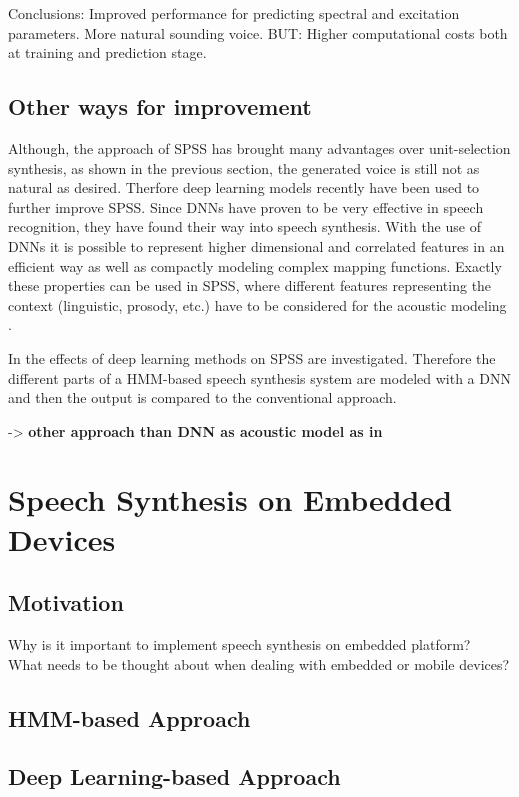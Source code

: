 Conclusions: Improved performance for predicting spectral and excitation parameters. More natural sounding voice. BUT: Higher computational costs both at training and prediction stage.

\newpage

\subsection{Other ways for improvement}
\label{subsec:deepeffect}

Although, the approach of \ac{SPSS} has brought many advantages over unit-selection synthesis, as shown in the previous section, the generated voice is still not as natural as desired. Therfore deep learning models recently have been used to further improve \ac{SPSS}. Since \acp{DNN} have proven to be very effective in speech recognition, they have found their way into speech synthesis. With the use of \acp{DNN} it is possible to represent higher dimensional and correlated features in an efficient way as well as compactly modeling complex mapping functions. Exactly these properties can be used in \ac{SPSS}, where different features representing the context (linguistic, prosody, etc.) have to be considered for the acoustic modeling \cite{hashimoto:effect}.

In \cite{hashimoto:effect} the effects of deep learning methods on \ac{SPSS} are investigated. Therefore the different parts of a \ac{HMM}-based speech synthesis system are modeled with a \ac{DNN} and then the output is compared to the conventional approach.

-> \textbf{other approach than DNN as acoustic model as in \cite{zen:deepstatistical}}

\newpage


\section{Speech Synthesis on Embedded Devices}
\label{sec:embeddedspeech}

\subsection{Motivation}
\label{subsec:motembedded}

Why is it important to implement speech synthesis on embedded platform?\\
What needs to be thought about when dealing with embedded or mobile devices?

\subsection{\ac{HMM}-based Approach}
\label{subsec:hmmembedded}

\subsection{Deep Learning-based Approach}
\label{subsec:deepembedded}

\clearpage
